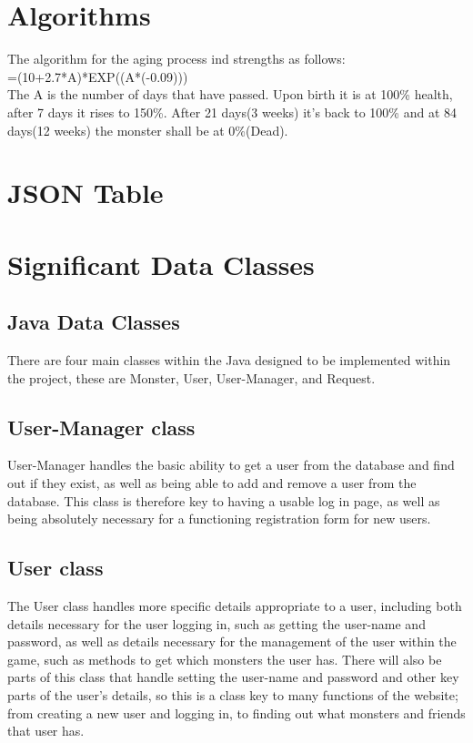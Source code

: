 \documentclass{project}
\begin{document}
\section{Algorithms}
The algorithm for the aging process ind strengths as follows:\\
=(10+2.7*A)*EXP((A*(-0.09)))\\
The A is the number of days that have passed. Upon birth it is at 100\% health, after 7 days it rises to 150\%. After 21 days(3 weeks) it's back to 100\% and at 84 days(12 weeks) the monster shall be at 0\%(Dead). 

\section{JSON Table}


\section{Significant Data Classes}
\subsection{Java Data Classes}
There are four main classes within the Java designed to be implemented within the project, these are Monster, User, User-Manager, and Request.
\subsection{User-Manager class}
User-Manager handles the basic ability to get a user from the database and find out if they exist, as well as being able to add and remove a user from the database. This class is therefore key to having a usable log in page, as well as being absolutely necessary for a functioning registration form for new users.
\subsection{User class}
The User class handles more specific details appropriate to a user, including both details necessary for the user logging in, such as getting the user-name and password, as well as details necessary for the management of the user within the game, such as methods to get which monsters the user has. There will also be parts of this class that handle setting the user-name and password and other key parts of the user’s details, so this is a class key to many functions of the website; from creating a new user and logging in, to finding out what monsters and friends that user has.
\end{document}
